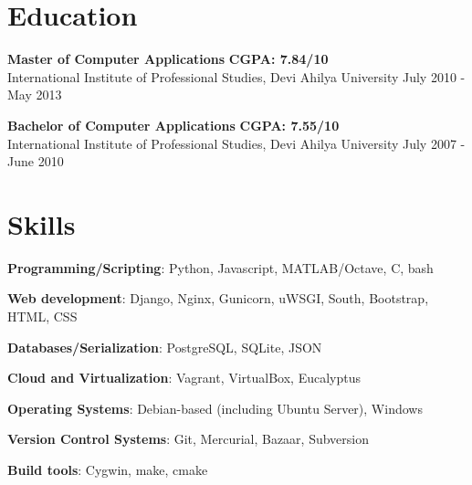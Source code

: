 \documentclass[margin,line]{resume}
\begin{document}
\begin{resume}
\begin{list2}
	\end{list2}

    \section{\mysidestyle Education}

    \begin{list2}
	\item \textbf{Master of Computer Applications} \hspace{73mm} \textbf{CGPA: 7.84/10} \\ International Institute of Professional Studies, Devi Ahilya University \hspace{17mm} July 2010 - May 2013
	\end{list2}

	\begin{list2}
	\item \textbf{Bachelor of Computer Applications} \hspace{70mm} \textbf{CGPA: 7.55/10} \\ International Institute of Professional Studies, Devi Ahilya University \hspace{20mm} July 2007 - June 2010
	\end{list2}


    \section{\mysidestyle Skills} 

    \begin{list2}
	\item \textbf{Programming/Scripting}: \hspace{5mm} Python, Javascript, MATLAB/Octave, C, bash
	\item \textbf{Web development}: \hspace{16mm} Django, Nginx, Gunicorn, uWSGI, South, Bootstrap, HTML, CSS
	\item \textbf{Databases/Serialization}: \hspace{5.7mm} PostgreSQL, SQLite,	JSON
	\item \textbf{Cloud and Virtualization}: \hspace{3mm} Vagrant, VirtualBox, Eucalyptus
	\item \textbf{Operating Systems}: \hspace{13.8mm} Debian-based (including Ubuntu Server), Windows
	\item \textbf{Version Control Systems}: \hspace{3.8mm} Git, Mercurial, Bazaar, Subversion
	\item \textbf{Build tools}: \hspace{28mm} Cygwin, make, cmake
	\end{list2}


\end{resume}
\end{document}
